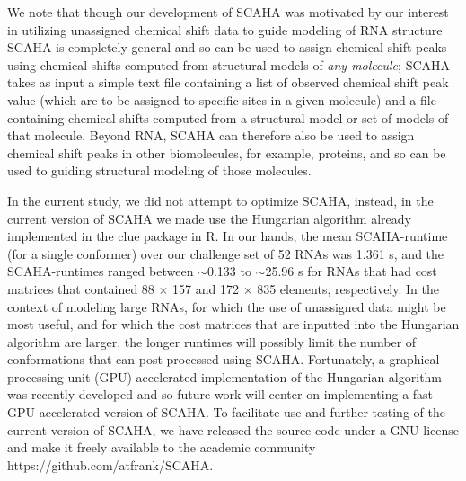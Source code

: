 \documentclass[journal=jcisd8,manuscript=article,layout=onecolumn]{achemso}
\begin{document}
We note that though our development of SCAHA was motivated by our interest in utilizing unassigned chemical shift data to guide modeling of RNA structure SCAHA is completely general and so can be used to assign chemical shift peaks using chemical shifts computed from structural models of \textit{any molecule}; SCAHA takes as input a simple text file containing a list of observed chemical shift peak value (which are to be assigned to specific sites in a given molecule) and a file containing chemical shifts computed from a structural model or set of models of that molecule. Beyond RNA, SCAHA can therefore also be used to assign chemical shift peaks in other biomolecules, for example, proteins, and so can be used to guiding structural modeling of those molecules.

In the current study, we did not attempt to optimize SCAHA, instead, in the current version of SCAHA we made use the Hungarian algorithm already implemented in the clue package in R\cite{hornik2005a}. In our hands, the mean SCAHA-runtime (for a single conformer) over our challenge set of 52 RNAs was 1.361 s, and the SCAHA-runtimes ranged between $\sim$0.133 to $\sim$25.96 s for RNAs that had cost matrices that contained 88 $\times$ 157  and 172 $\times$ 835 elements, respectively. In the context of modeling large RNAs, for which the use of unassigned data might be most useful, and for which the cost matrices that are inputted into the Hungarian algorithm are larger, the longer runtimes will possibly limit the number of conformations that can post-processed using SCAHA. Fortunately, a graphical processing unit (GPU)-accelerated implementation of the Hungarian algorithm was recently developed\cite{date2016gpu} and so future work will center on implementing a fast GPU-accelerated version of SCAHA. To facilitate use and further testing of the current version of SCAHA, we have released the source code under a GNU license and make it freely available to the academic community https://github.com/atfrank/SCAHA. 
\end{document}
